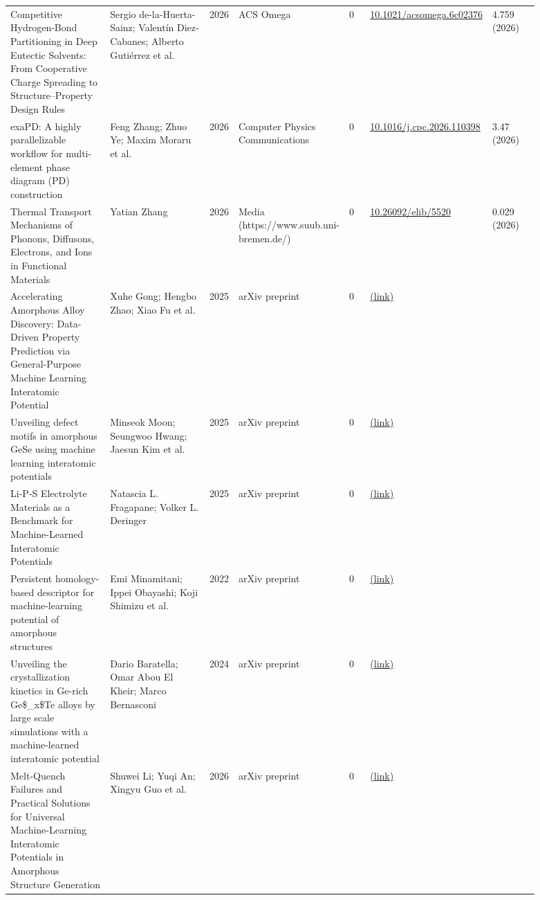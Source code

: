 \documentclass[10pt,a4paper]{article}
\begin{document}
{\begin{longtable}{p{0.192\linewidth}p{0.192\linewidth}p{0.043\linewidth}p{0.192\linewidth}p{0.043\linewidth}p{0.132\linewidth}p{0.096\linewidth}}
Competitive Hydrogen-Bond Partitioning in Deep Eutectic Solvents: From Cooperative Charge Spreading to Structure–Property Design Rules & Sergio de-la-Huerta-Sainz; Valentín Diez‐Cabanes; Alberto Gutiérrez et al. & 2026 & ACS Omega & 0 & \href{https://doi.org/10.1021/acsomega.6c02376}{10.1021/acsomega.6c02376} & 4.759 (2026) \\
exaPD: A highly parallelizable workflow for multi-element phase diagram (PD) construction & Feng Zhang; Zhuo Ye; Maxim Moraru et al. & 2026 & Computer Physics Communications & 0 & \href{https://doi.org/10.1016/j.cpc.2026.110398}{10.1016/j.cpc.2026.110398} & 3.47 (2026) \\
Thermal Transport Mechanisms of Phonons, Diffusons, Electrons, and Ions in Functional Materials & Yatian Zhang & 2026 & Media (https://www.suub.uni-bremen.de/) & 0 & \href{https://doi.org/10.26092/elib/5520}{10.26092/elib/5520} & 0.029 (2026) \\
Accelerating Amorphous Alloy Discovery: Data-Driven Property Prediction via General-Purpose Machine Learning Interatomic Potential & Xuhe Gong; Hengbo Zhao; Xiao Fu et al. & 2025 & arXiv preprint & 0 & \href{http://arxiv.org/abs/2508.11989v1}{(link)} &  \\
Unveiling defect motifs in amorphous GeSe using machine learning interatomic potentials & Minseok Moon; Seungwoo Hwang; Jaesun Kim et al. & 2025 & arXiv preprint & 0 & \href{http://arxiv.org/abs/2506.15934v1}{(link)} &  \\
Li-P-S Electrolyte Materials as a Benchmark for Machine-Learned Interatomic Potentials & Natascia L. Fragapane; Volker L. Deringer & 2025 & arXiv preprint & 0 & \href{http://arxiv.org/abs/2511.16569v1}{(link)} &  \\
Persistent homology-based descriptor for machine-learning potential of amorphous structures & Emi Minamitani; Ippei Obayashi; Koji Shimizu et al. & 2022 & arXiv preprint & 0 & \href{http://arxiv.org/abs/2206.13727v3}{(link)} &  \\
Unveiling the crystallization kinetics in Ge-rich Ge\$\_x\$Te alloys by large scale simulations with a machine-learned interatomic potential & Dario Baratella; Omar Abou El Kheir; Marco Bernasconi & 2024 & arXiv preprint & 0 & \href{http://arxiv.org/abs/2404.15128v1}{(link)} &  \\
Melt-Quench Failures and Practical Solutions for Universal Machine-Learning Interatomic Potentials in Amorphous Structure Generation & Shuwei Li; Yuqi An; Xingyu Guo et al. & 2026 & arXiv preprint & 0 & \href{http://arxiv.org/abs/2606.16385v2}{(link)} &  \\

\end{longtable}}
\end{document}
